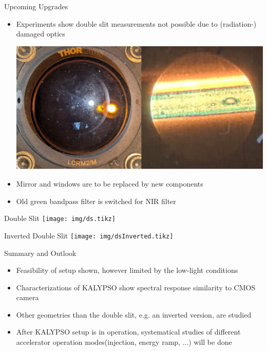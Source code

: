 \documentclass[english]{article}
\def\boxheight{200mm}
\def\boxsep{5mm}
\begin{document}
\begin{boxgrayw}[\boxheight]{Upcoming Upgrades}{}
	\begin{itemize}
		\item Experiments show double slit measurements not possible due to (radiation-) damaged optics
		
		\vspace{5mm}
		\includegraphics[width=145mm]{img/mirrorAndWindow.png}
		\item Mirror and windows are to be replaced by new components
		\item Old green bandpass filter is switched for NIR filter
	\end{itemize}
\end{boxgrayw}
\vskip\boxsep
\begin{boxgrayw}[\boxheight]{Double Slit}{}
	\texttt{[image: img/ds.tikz]}
\end{boxgrayw}
\begin{boxgrayw}[\boxheight]{Inverted Double Slit}{}
	\texttt{[image: img/dsInverted.tikz]}
\end{boxgrayw}
\begin{boxgrayw}[\boxheight]{Summary and Outlook}{}
	\begin{itemize}
		\item Feasibility of setup shown, however limited by the low-light conditions
		\item Characterizations of KALYPSO show spectral response similarity to CMOS camera
		\item Other geometries than the double slit, e.g. an inverted version, are studied
		\item After KALYPSO setup is in operation, systematical studies of different accelerator operation modes(injection, energy ramp, ...) will be done
	\end{itemize}
\end{boxgrayw}
	
\end{document}
